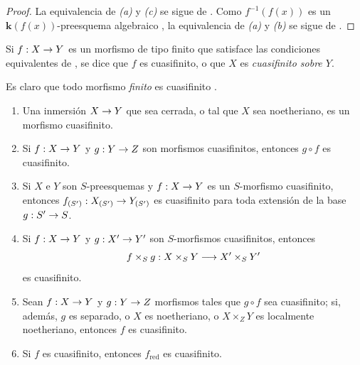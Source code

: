 \documentclass[oneside,10pt]{amsart}
\makeatletter
\newcommand{\ega@arrow}[2]{\mathchoice{#1}{#2}{#2}{#2}}
\renewcommand{\to}{\ega@arrow{\longrightarrow}{\rightarrow}}
\let\EGAOriginalLabel\label
\renewcommand{\label}[1]{\phantomsection\EGAOriginalLabel{#1}}
\makeatother
\begin{document}
\begin{proof}
La equivalencia de \emph{(a)} y \emph{(c)} se sigue de .
Como $f^{-1}(f(x))$ es un $\boldsymbol{k}(f(x))$-preesquema algebraico , la equivalencia de \emph{(a)} y \emph{(b)} se sigue de .
\end{proof}

\begin{definition}[6.2.3]
\label{II.6.2.3-fr}
Si $f:X\to Y$ es un morfismo de tipo finito que satisface las condiciones equivalentes de , se dice que $f$ es cuasifinito, o que $X$ es \emph{cuasifinito sobre $Y$}.
\end{definition}

Es claro que todo morfismo \emph{finito} es cuasifinito .

\begin{proposition}[6.2.4]
\label{II.6.2.4-fr}
\medskip\noindent
\begin{enumerate}
  \item[{\rm(i)}] Una inmersión $X\to Y$ que sea cerrada, o tal que $X$ sea noetheriano, es un morfismo cuasifinito.
  \item[{\rm(ii)}] Si $f:X\to Y$ y $g:Y\to Z$ son morfismos cuasifinitos, entonces $g\circ f$ es cuasifinito.
  \item[{\rm(iii)}] Si $X$ e $Y$ son $S$-preesquemas y $f:X\to Y$ es un $S$-morfismo cuasifinito, entonces $f_{(S')}:X_{(S')}\to Y_{(S')}$ es cuasifinito para toda extensión de la base $g:S'\to S$.
  \item[{\rm(iv)}] Si $f:X\to Y$ y $g:X'\to Y'$ son $S$-morfismos cuasifinitos, entonces
    \[
f\times_S g:X\times_S Y\to X'\times_S Y'
\]
    es cuasifinito.
  \item[{\rm(v)}] Sean $f:X\to Y$ y $g:Y\to Z$ morfismos tales que $g\circ
f$ sea cuasifinito; si, además, $g$ es separado, o $X$ es noetheriano, o $X\times_ZY$ es localmente noetheriano, entonces $f$ es cuasifinito.
  \item[{\rm(vi)}] Si $f$ es cuasifinito, entonces $f_{\mathrm{red}}$ es cuasifinito.
\end{enumerate}
\end{proposition}
\end{document}
